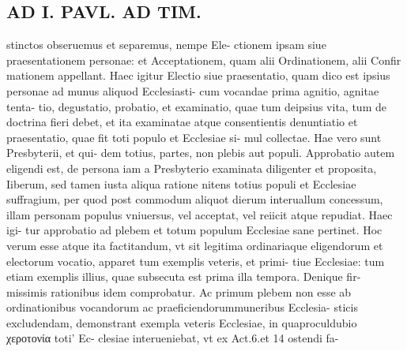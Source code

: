 \documentclass{article}
\begin{document}
\begin{pages}
\section*{AD I. PAVL. AD TIM. }\pstart stinctos obseruemus et separemus, nempe Ele- ctionem ipsam siue praesentationem personae: et Acceptationem, quam alii Ordinationem, alii Confir mationem appellant. Haec igitur Electio siue praesentatio, quam dico est ipsius personae ad munus aliquod Ecclesiasti- cum vocandae prima agnitio, agnitae tenta- tio, degustatio, probatio, et examinatio, quae tum deipsius vita, tum de doctrina fieri debet, et ita examinatae atque consentientis denuntiatio et praesentatio, quae fit toti populo et Ecclesiae si- mul collectae. Hae vero sunt Presbyterii, et qui- dem totius, partes, non plebis aut populi. Approbatio autem eligendi est, de persona iam a Presbyterio examinata diligenter et proposita, Iiberum, sed tamen iusta aliqua ratione nitens totius populi et Ecclesiae suffragium, per quod post commodum aliquot dierum interuallum concessum, illam personam populus vniuersus, vel acceptat, vel reiicit atque repudiat. Haec igi- tur approbatio ad plebem et totum populum Ecclesiae sane pertinet. Hoc verum esse atque ita factitandum, vt sit legitima ordinariaque eligendorum et electorum vocatio, apparet tum exemplis veteris, et primi- tiue Ecclesiae: tum etiam exemplis illius, quae subsecuta est prima illa tempora. Denique fir- missimis rationibus idem comprobatur. Ac primum plebem non esse ab ordinationibus vocandorum ac praeficiendorummuneribus Ecclesia- sticis excludendam, demonstrant exempla veteris Ecclesiae, in quaproculdubio χεροτονία toti' Ec- clesiae interueniebat, vt ex Act.6.et 14 ostendi fa-  \pend

\end{pages}
\end{document}
